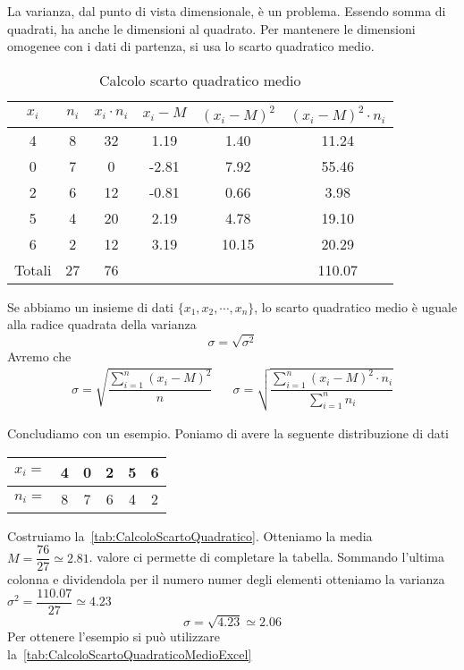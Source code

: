 La varianza,  dal punto di vista dimensionale, è un problema.  Essendo somma di quadrati, ha anche le dimensioni al quadrato. Per mantenere le dimensioni omogenee con i dati  di partenza, si usa lo scarto quadratico medio. 
\begin{table}
	\centering
	\begin{tabular}{S[table-format=1.0]S[table-format=2.0]S[table-format=2.0]S[table-format=1.2]S[table-format=1.4]S[table-format=2.4] }
		\toprule
		{$x_i$}	&{$n_i$}  & {$x_i\cdot n_i$} & {$x_i-M$} & {$(x_i-M )^2$} & {$(x_i-M)^2\cdot n_i $ } \\
			& 8 & 32  & 1.19 &1.40  & 11.24 \\ 
		0	& 7 & 0 & -2.81 &7.92  & 55.46 \\ 
		2	& 6 & 12 & -0.81 &0.66  & 3.98 \\ 
		5	& 4 & 20& 2.19&4.78   & 19.10 \\ 
		6	& 2 & 12 & 3.19 &10.15  &20.29 \\
		\midrule 
		{Totali}& 27& 76 &  &  & 110.07 \\
		\bottomrule 
	\end{tabular} 
	\caption{Calcolo scarto quadratico medio}
	\label{tab:CalcoloScartoQuadratico}
\end{table}
\begin{defn}
	Se abbiamo un insieme di dati $\lbrace x_{1},x_{2},\cdots,x_{n}\rbrace$, lo scarto quadratico medio è  uguale alla radice quadrata della varianza \[\sigma=\sqrt{\sigma^2} \]
	Avremo che 
	\begin{align*}
		\sigma=\sqrt{\dfrac{\sum_{i=1}^{n}(x_{i}-M)^2}{n}}&&\sigma=\sqrt{\dfrac{\sum_{i=1}^{n}(x_{i}-M)^{2}\cdot n_{i}}{\sum_{i=1}^{n} n_{i}}}
	\end{align*}
\end{defn}
Concludiamo con un esempio. Poniamo di avere la seguente distribuzione di dati
\begin{center}
	\begin{tabular}{l*{5} {S[table-format=1.0]}}
		{$x_{i}=$}	&4  &0  &2  &5  &6\\
		\midrule 
		{$n_{i}=$}	&8 &7  &6 &4 &2\\   
	\end{tabular}
\end{center}
Costruiamo la~\vref{tab:CalcoloScartoQuadratico}. Otteniamo la media  $M=\dfrac{76}{27}\simeq\num{2.81}$.  valore ci permette di completare la tabella. Sommando l'ultima colonna e dividendola per il  numero numer degli elementi otteniamo la varianza $\sigma^2=\dfrac{110.07}{27}\simeq\num{4.23}$
\[\sigma=\sqrt{4.23}\simeq\num{2.06}\]
Per ottenere l'esempio si può utilizzare la~\vref{tab:CalcoloScartoQuadraticoMedioExcel}
